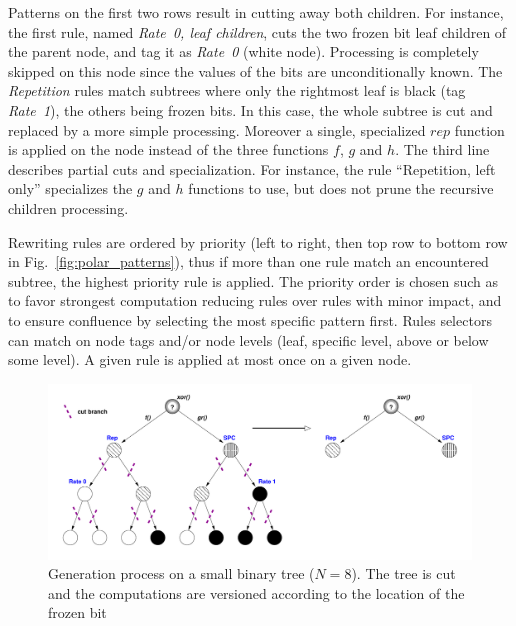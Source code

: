 Patterns on the first two rows result in cutting away both children. For
instance, the first rule, named \emph{Rate~0, leaf children}, cuts the two
frozen bit leaf children of the parent node, and tag it as \emph{Rate~0} (white
node). Processing is completely skipped on this node since the values of the
bits are unconditionally known. The \emph{Repetition} rules match subtrees where
only the rightmost leaf is black (tag \emph{Rate~1}), the others being frozen
bits. In this case, the whole subtree is cut and replaced by a more simple
processing. Moreover a single, specialized $rep$ function is applied on the node
instead of the three functions $f$, $g$ and $h$. The third line describes
partial cuts and specialization. For instance, the rule ``Repetition, left
only'' specializes the $g$ and $h$ functions to use, but does not prune the
recursive children processing.

Rewriting rules are ordered by priority (left to right, then top row to bottom
row in Fig.~\ref{fig:polar_patterns}), thus if more than one rule match an
encountered subtree, the highest priority rule is applied. The priority order is
chosen such as to favor strongest computation reducing rules over rules with
minor impact, and to ensure confluence by selecting the most specific pattern
first. Rules selectors can match on node tags and/or node levels (leaf, specific
level, above or below some level). A given rule is applied at most once on a
given node.

\begin{figure}
  \centering
  \includegraphics[width=1.00\textwidth]{polar/patterns_example}
  \caption{Generation process on a small binary tree ($N = 8$). The tree is cut
    and the computations are versioned according to the location of the frozen
    bit}
  \label{fig:polar_patterns_example}
\end{figure}

\begin{listing}
  \inputminted[frame=lines,linenos]{C++}{main/chapter2/src/polar/generated_sc_decoder.cpp}
  \caption{The final code generated corresponding to the pruned tree in
    Fig.~\ref{fig:polar_patterns_example}.}
  \label{lst:polar_patterns_example}
\end{listing}

